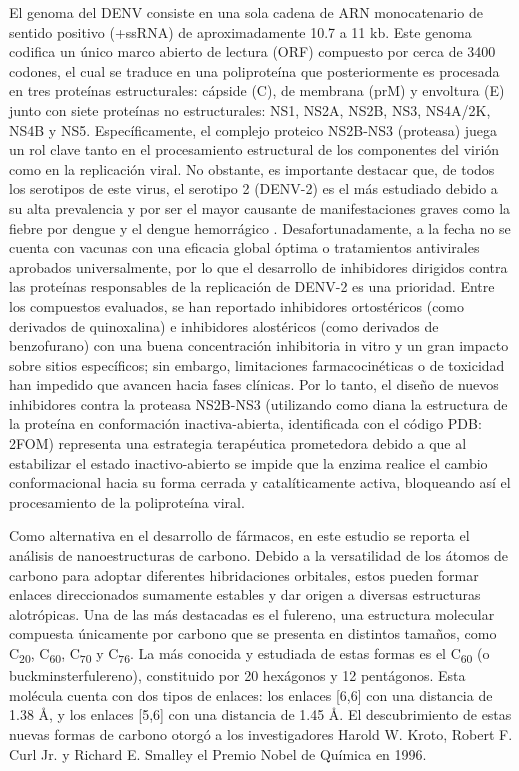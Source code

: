 El genoma del DENV consiste en una sola cadena de ARN monocatenario de sentido positivo (+ssRNA) de aproximadamente 10.7 a 11 kb. Este genoma codifica un único marco abierto de lectura (ORF) compuesto por cerca de 3400 codones, el cual se traduce en una poliproteína que posteriormente es procesada en tres proteínas estructurales: cápside (C), de membrana (prM) y envoltura (E) junto con siete proteínas no estructurales: NS1, NS2A, NS2B, NS3, NS4A/2K, NS4B y NS5. Específicamente, el complejo proteico NS2B-NS3 (proteasa) juega un rol clave tanto en el procesamiento estructural de los componentes del virión como en la replicación viral. No obstante, es importante destacar que, de todos los serotipos de este virus, el serotipo 2 (DENV-2) es el más estudiado debido a su alta prevalencia y por ser el mayor causante de manifestaciones graves como la fiebre por dengue y el dengue hemorrágico \cite{contreras2021aspectos}. Desafortunadamente, a la fecha no se cuenta con vacunas con una eficacia global óptima o tratamientos antivirales aprobados universalmente, por lo que el desarrollo de inhibidores dirigidos contra las proteínas responsables de la replicación de DENV-2 es una prioridad. Entre los compuestos evaluados, se han reportado inhibidores ortostéricos (como derivados de quinoxalina) e inhibidores alostéricos (como derivados de benzofurano) con una buena concentración inhibitoria in vitro y un gran impacto sobre sitios específicos; sin embargo, limitaciones farmacocinéticas o de toxicidad han impedido que avancen hacia fases clínicas. Por lo tanto, el diseño de nuevos inhibidores contra la proteasa NS2B-NS3 (utilizando como diana la estructura de la proteína en conformación inactiva-abierta, identificada con el código PDB: 2FOM) representa una estrategia terapéutica prometedora debido a que al estabilizar el estado inactivo-abierto se impide que la enzima realice el cambio conformacional hacia su forma cerrada y catalíticamente activa, bloqueando así el procesamiento de la poliproteína viral. 

Como alternativa en el desarrollo de fármacos, en este estudio se reporta el análisis de nanoestructuras de carbono. Debido a la versatilidad de los átomos de carbono para adoptar diferentes hibridaciones orbitales, estos pueden formar enlaces direccionados sumamente estables y dar origen a diversas estructuras alotrópicas. Una de las más destacadas es el fulereno, una estructura molecular compuesta únicamente por carbono que se presenta en distintos tamaños, como C\textsubscript{20}, C\textsubscript{60}, C\textsubscript{70} y C\textsubscript{76}. La más conocida y estudiada de estas formas es el C\textsubscript{60} (o buckminsterfulereno), constituido por 20 hexágonos y 12 pentágonos. Esta molécula cuenta con dos tipos de enlaces: los enlaces [6,6] con una distancia de 1.38 Å, y los enlaces [5,6] con una distancia de 1.45 Å. \cite{fajardo2012dengue} El descubrimiento de estas nuevas formas de carbono otorgó a los investigadores Harold W. Kroto, Robert F. Curl Jr. y Richard E. Smalley el Premio Nobel de Química en 1996.


